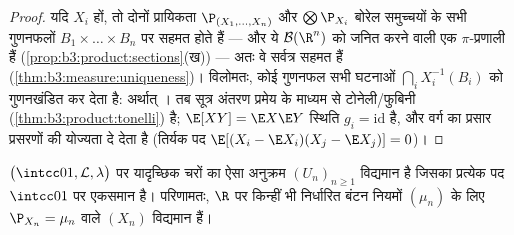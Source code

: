 \begin{proof}
यदि $X_i$  हों, तो दोनों प्रायिकता  $\P_{(X_1,\dots,X_n)}$ और $\bigotimes\P_{X_i}$ बोरेल
समुच्चयों के सभी गुणनफलों $B_1\times\dots\times B_n$ पर सहमत होते हैं --- और ये $\mathcal B(\R^n)$ को
जनित करने वाली एक $\pi$-प्रणाली हैं (\cref{prop:b3:product:sections}(ख)) --- अतः वे सर्वत्र
सहमत हैं (\cref{thm:b3:measure:uniqueness})। विलोमतः, कोई गुणनफल  सभी घटनाओं $\bigcap_iX_i^{-1}(B_i)$ को
गुणनखंडित कर देता है: अर्थात् । तब  सूत्र अंतरण
प्रमेय के माध्यम से टोनेली/फुबिनी (\cref{thm:b3:product:tonelli}) है; $\E[XY] = \E X\E Y$ स्थिति $g_i =
\mathrm{id}$ है,
और वर्ग का प्रसार प्रसरणों की योज्यता दे देता है (तिर्यक पद $\E[(X_i - \E X_i)(X_j - \E X_j)]
= 0$)।
\end{proof}

\begin{theorem}[स्वतंत्र अनुक्रमों का अस्तित्व]
\label{thm:b3:probability:existence}
$\bigl(\intcc01, \mathcal L, \lambda\bigr)$ पर  यादृच्छिक चरों का ऐसा अनुक्रम $(U_n)_{n\geq1}$ विद्यमान है
जिसका प्रत्येक पद $\intcc01$ पर एकसमान है। परिणामतः, $\R$ पर किन्हीं भी
निर्धारित बंटन नियमों $(\mu_n)$ के लिए $\P_{X_n} = \mu_n$ वाले  $(X_n)$ विद्यमान
हैं।
\end{theorem}

